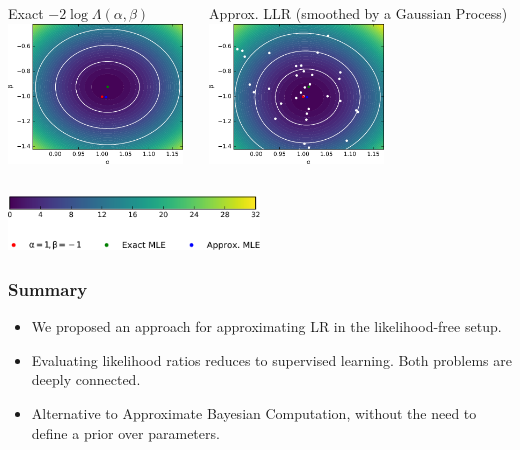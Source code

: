 \documentclass{beamer}
\begin{document}
\begin{frame}


    \begin{columns}
      \begin{column}[b]{0.48\textwidth}
        \centering
        \small Exact $-2 \log \Lambda(\alpha, \beta )$\\
        \vspace{0.5em}
        \includegraphics[height=10em]{figures/fig5a.pdf}
      \end{column}
      \begin{column}[b]{0.48\textwidth}
          \centering
          \small Approx. LLR (smoothed by a Gaussian Process)\\
          \vspace{0.5em}
          \includegraphics[height=10em]{figures/fig5c.pdf}
      \end{column}
    \end{columns}

    \vspace{1em}

    \centering
    \includegraphics[width=0.5\textwidth]{figures/fig5d.pdf}

\end{frame}


\begin{frame}
    \frametitle{Summary}

    \begin{itemize}
        \item We proposed an approach for approximating LR in the likelihood-free setup.

        \item Evaluating likelihood ratios reduces to supervised learning. Both problems are deeply connected.

        \item Alternative to Approximate Bayesian Computation, without the need to define a prior over parameters.
    \end{itemize}
\end{frame}
\end{document}
